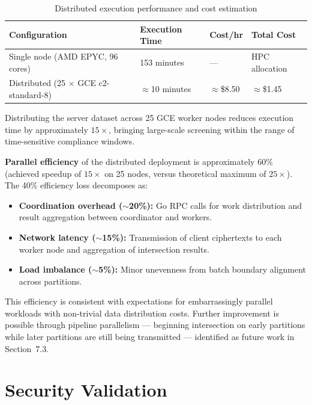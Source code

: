 \begin{table}[H]
\centering
\caption{Distributed execution performance and cost estimation}
\label{tab:distrib}
\begin{tabular}{@{}llll@{}}
\toprule
\textbf{Configuration} & \textbf{Execution Time} & \textbf{Cost/hr} & \textbf{Total Cost} \\
\midrule
Single node (AMD EPYC, 96 cores)      & 153 minutes & ---       & HPC allocation \\
Distributed (25 $\times$ GCE c2-standard-8) & $\approx$10 minutes & $\approx$\$8.50 & $\approx$\$1.45 \\
\bottomrule
\end{tabular}
\end{table}

Distributing the server dataset across 25 GCE worker nodes reduces execution time
by approximately $15\times$, bringing large-scale screening within the range of
time-sensitive compliance windows.

\textbf{Parallel efficiency} of the distributed deployment is approximately 60\%
(achieved speedup of $15\times$ on 25 nodes, versus theoretical maximum of $25\times$).
The 40\% efficiency loss decomposes as:
\begin{itemize}
    \item \textbf{Coordination overhead ($\sim$20\%):} Go RPC calls for work distribution
          and result aggregation between coordinator and workers.
    \item \textbf{Network latency ($\sim$15\%):} Transmission of client ciphertexts to
          each worker node and aggregation of intersection results.
    \item \textbf{Load imbalance ($\sim$5\%):} Minor unevenness from batch boundary
          alignment across partitions.
\end{itemize}

This efficiency is consistent with expectations for embarrassingly parallel workloads
with non-trivial data distribution costs. Further improvement is possible through
pipeline parallelism --- beginning intersection on early partitions while later
partitions are still being transmitted --- identified as future work in Section~7.3.

\section{Security Validation}

